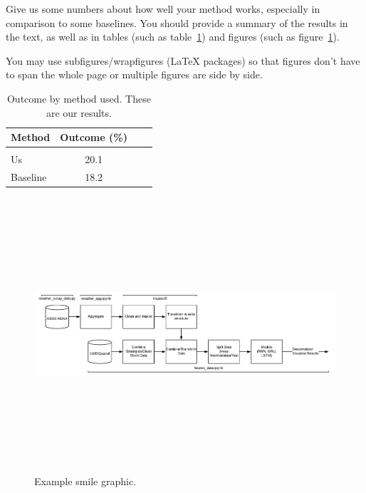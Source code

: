 \documentclass[twoside,11pt]{article}
\begin{document}
Give us some numbers about how well your method works, especially in comparison to some baselines.
You should provide a summary of the results in the text, as well as in tables (such as table~\ref{tab:example}) and figures (such as figure~\ref{fig:example}).

You may use subfigures/wrapfigures (LaTeX packages) so that figures don't have to span the whole page or multiple figures are side by side.

\begin{table}[htbp]
  \centering
  \begin{tabular}{lclc}
    Method & Outcome (\%) \\
    \hline \\[-11pt]
    Us & 20.1 \\
    Baseline & 18.2 \\ \hline
  \end{tabular}
  \label{tab:example}
    \caption{Outcome by method used. These are our results.}
\end{table}

\begin{figure}[htbp]
  \centering
  \includegraphics[height=4in]{DataPipeline.png}
  \caption{Example smile graphic.}
  \label{fig:example}
\end{figure}


\end{document}
